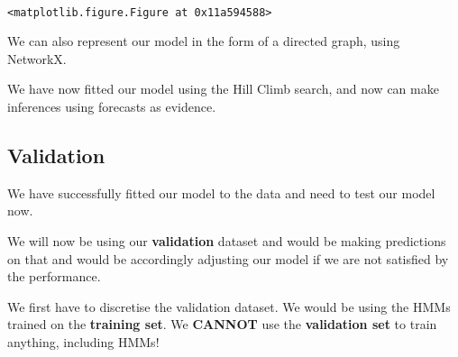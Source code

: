 \documentclass[11pt]{article}
\begin{document}
    \begin{center}
    \end{center}
    { \hspace*{\fill} \\}
    
    
    \begin{verbatim}
<matplotlib.figure.Figure at 0x11a594588>
    \end{verbatim}

    
    We can also represent our model in the form of a directed graph, using
NetworkX.

    We have now fitted our model using the Hill Climb search, and now can
make inferences using forecasts as evidence.

\hypertarget{validation}{%
\subsection{Validation}\label{validation}}

We have successfully fitted our model to the data and need to test our
model now.

We will now be using our \textbf{validation} dataset and would be making
predictions on that and would be accordingly adjusting our model if we
are not satisfied by the performance.

We first have to discretise the validation dataset. We would be using
the HMMs trained on the \textbf{training set}. We \textbf{CANNOT} use
the \textbf{validation set} to train anything, including HMMs!
\end{document}
